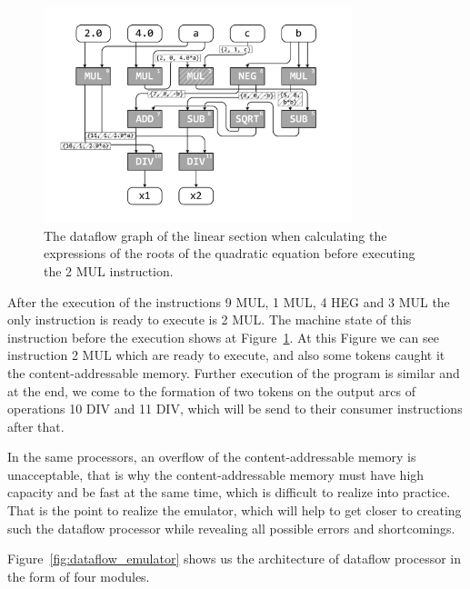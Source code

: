 \documentclass[
11pt,%
tightenlines,%
twoside,%
onecolumn,%
nofloats,%
nobibnotes,%
nofootinbib,%
superscriptaddress,%
noshowpacs,%
centertags]%
{revtex4}
\begin{document}
\begin{figure}[h]
\setcaptionmargin{5mm}
\onelinecaptionsfalse %
\includegraphics[width=0.80\textwidth]{pics/dataflow2.pdf}
\caption{The dataflow graph of the linear section when calculating the expressions of the roots of the quadratic equation before executing the 2 MUL instruction.}\label{fig:dataflow2}
\end{figure}

After the execution of the instructions 9 MUL, 1 MUL, 4 HEG and 3 MUL the only instruction is ready to execute is 2 MUL. The machine state of this instruction before the execution shows at Figure~\ref{fig:dataflow2}.
At this Figure we can see instruction 2 MUL which are ready to execute, and also some tokens caught it the content-addressable memory. Further execution of the program is similar and at the end, we come to the formation of two tokens on the output arcs of operations 10 DIV and 11 DIV, which will be send to their consumer instructions after that.



In the same processors, an overflow of the content-addressable memory is unacceptable, that is why the content-addressable memory must have high capacity and be fast at the same time, which is difficult to realize into practice. That is the point to realize the emulator, which will help to get closer to creating such the dataflow processor while revealing all possible errors and shortcomings.


Figure~\ref{fig:dataflow_emulator} shows us the architecture of dataflow processor in the form of four modules.
\end{document}
